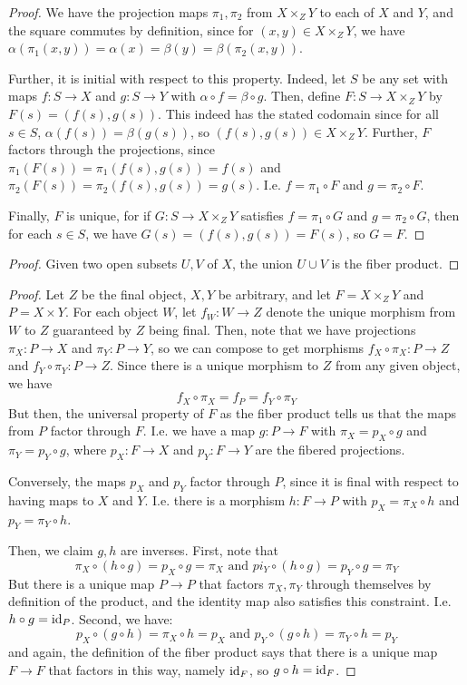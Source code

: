\documentclass[12pt]{exam}
\begin{document}
\begin{proof}
	We have the projection maps $\pi_1,\pi_2$ from $X \times_Z Y$ to each of $X$ and $Y$, and the square commutes by definition, since for $(x,y) \in X \times_Z Y$, we have $\alpha(\pi_1(x,y)) = \alpha(x) = \beta(y) = \beta(\pi_2(x,y))$.
	
	Further, it is initial with respect to this property. Indeed, let $S$ be any set with maps $f : S \to X$ and $g : S \to Y$ with $\alpha \circ f = \beta \circ g$. Then, define $F : S \to X \times_Z Y$ by $F(s) = (f(s),g(s))$. This indeed has the stated codomain since for all $s \in S$, $\alpha(f(s)) = \beta(g(s))$, so $(f(s),g(s)) \in X \times_Z Y$. Further, $F$ factors through the projections, since $\pi_1(F(s)) = \pi_1(f(s),g(s)) = f(s)$ and $\pi_2(F(s)) = \pi_2(f(s),g(s)) = g(s)$. I.e. $f = \pi_1 \circ F$ and $g = \pi_2 \circ F$.
	
	Finally, $F$ is unique, for if $G : S \to X \times_Z Y$ satisfies $f = \pi_1 \circ G$ and $g = \pi_2 \circ G$, then for each $s \in S$, we have $G(s) = (f(s),g(s)) = F(s)$, so $G = F$.
\end{proof}

\begin{proof}
	Given two open subsets $U,V$ of $X$, the union $U \cup V$ is the fiber product.
\end{proof}

\begin{proof}
	Let $Z$ be the final object, $X,Y$ be arbitrary, and let $F = X \times_Z Y$ and $P = X \times Y$. For each object $W$, let $f_W : W \to Z$ denote the unique morphism from $W$ to $Z$ guaranteed by $Z$ being final. Then, note that we have projections $\pi_X : P \to X$ and $\pi_Y : P \to Y$, so we can compose to get morphisms $f_X \circ \pi_X : P \to Z$ and $f_Y \circ \pi_Y : P \to Z$. Since there is a unique morphism to $Z$ from any given object, we have
	\[ f_X \circ \pi_X = f_P = f_Y \circ \pi_Y \]
	But then, the universal property of $F$ as the fiber product tells us that the maps from $P$ factor through $F$. I.e. we have a map $g : P \to F$ with $\pi_X = p_X \circ g$ and $\pi_Y = p_Y \circ g$, where $p_X : F \to X$ and $p_Y : F \to Y$ are the fibered projections.
	
	Conversely, the maps $p_X$ and $p_Y$ factor through $P$, since it is final with respect to having maps to $X$ and $Y$. I.e. there is a morphism $h : F \to P$ with $p_X = \pi_X \circ h$ and $p_Y = \pi_Y \circ h$.
	
	Then, we claim $g,h$ are inverses. First, note that
	\[ \pi_X \circ (h \circ g) = p_X \circ g = \pi_X \text{ and } pi_Y \circ (h \circ g) = p_Y \circ g = \pi_Y \]
	But there is a unique map $P \to P$ that factors $\pi_X,\pi_Y$ through themselves by definition of the product, and the identity map also satisfies this constraint. I.e. $h \circ g = \operatorname{id}_P$. Second, we have:
	\[ p_X \circ (g \circ h) = \pi_X \circ h = p_X \text{ and } p_Y \circ (g \circ h) = \pi_Y \circ h = p_Y \]
	and again, the definition of the fiber product says that there is a unique map $F \to F$ that factors in this way, namely $\operatorname{id}_F$, so $g \circ h = \operatorname{id}_F$.
\end{proof}
\end{document}
